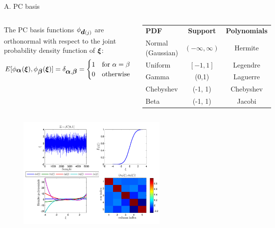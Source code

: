\documentclass[10pt,xcolor = dvipsnames]{beamer}
\newcommand{\vc}[1]{\vspace*{#1cm}}
\newcommand{\bld}[1]{\mbox{\boldmath $#1$}}
\newcommand{\bxi}{\bld{\xi}}
\begin{document}
\begin{frame}{A. PC basis}

\vc{-0.2}\begin{block}{}

\begin{columns}


{\scriptsize The \alert{PC basis} functions $\phi_{{\bld d}(j)}$ are orthonormal with respect to the joint probability density function of $\bxi$:
$$
E[ \phi_{\bld \alpha} (\bxi), \phi_{\bld \beta} (\bxi) ] = \delta_{{\bld \alpha},{\bld \beta}} =\begin{cases} 1 & \mbox{for } \alpha = \beta \\ 0 & \mbox{otherwise} \end{cases}
$$}


\vc{-0.5}\begin{center}
{\scriptsize
\begin{tabular}{lcc} \hline
{\bf PDF} & {\bf Support} & {\bf Polynomials} \\
Normal (Gaussian) & $(-\infty,\infty)$ & Hermite \\
Uniform & $[-1, 1]$ & Legendre\\
Gamma & (0,1) & Laguerre \\
Chebyshev & (-1, 1) & Chebyshev\\
Beta & (-1, 1)& Jacobi\\ \hline
\end{tabular}}
\end{center}
\end{columns}
\vc{-0.2}
\end{block}

\vc{-0.2}\begin{figure}
\includegraphics[width=2.9in]{PCbasis.png}
\end{figure}


\end{frame}
\end{document}

